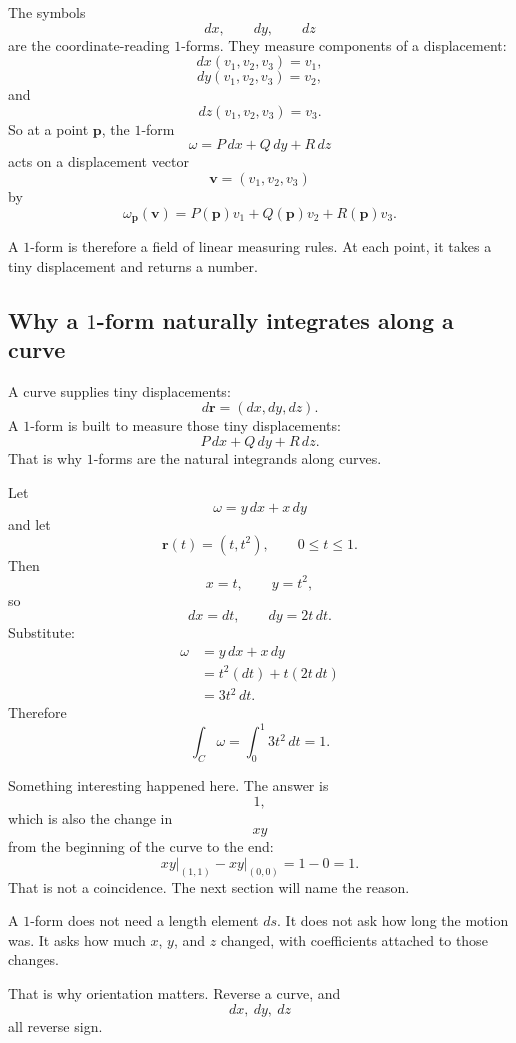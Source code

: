 The symbols
\[
    dx,\qquad dy,\qquad dz
\]
are the coordinate-reading \(1\)-forms.  They measure components of a displacement:
\[
    dx(v_1,v_2,v_3)=v_1,
\]
\[
    dy(v_1,v_2,v_3)=v_2,
\]
and
\[
    dz(v_1,v_2,v_3)=v_3.
\]
So at a point \(\mathbf p\), the \(1\)-form
\[
    \omega=P\,dx+Q\,dy+R\,dz
\]
acts on a displacement vector
\[
    \mathbf v=(v_1,v_2,v_3)
\]
by
\[
\boxed{
    \omega_{\mathbf p}(\mathbf v)
    =
    P(\mathbf p)v_1+Q(\mathbf p)v_2+R(\mathbf p)v_3.
}
\]

A \(1\)-form is therefore a field of linear measuring rules.  At each point, it takes a
tiny displacement and returns a number.

\subsection{Why a \(1\)-form naturally integrates along a curve}

A curve supplies tiny displacements:
\[
    d\mathbf r=(dx,dy,dz).
\]
A \(1\)-form is built to measure those tiny displacements:
\[
    P\,dx+Q\,dy+R\,dz.
\]
That is why \(1\)-forms are the natural integrands along curves.

\begin{example}
Let
\[
    \omega=y\,dx+x\,dy
\]
and let
\[
    \mathbf r(t)=(t,t^2),
    \qquad
    0\le t\le1.
\]
Then
\[
    x=t,\qquad y=t^2,
\]
so
\[
    dx=dt,
    \qquad
    dy=2t\,dt.
\]
Substitute:
\[
\begin{aligned}
\omega
&=
y\,dx+x\,dy\\
&=
t^2(dt)+t(2t\,dt)\\
&=
3t^2\,dt.
\end{aligned}
\]
Therefore
\[
\boxed{
    \int_C \omega
    =
    \int_0^1 3t^2\,dt
    =
    1.
}
\]

Something interesting happened here.  The answer is
\[
    1,
\]
which is also the change in
\[
    xy
\]
from the beginning of the curve to the end:
\[
    xy\big|_{(1,1)}-xy\big|_{(0,0)}=1-0=1.
\]
That is not a coincidence.  The next section will name the reason.
\end{example}

A \(1\)-form does not need a length element \(ds\).  It does not ask how long the
motion was.  It asks how much \(x\), \(y\), and \(z\) changed, with coefficients attached
to those changes.

That is why orientation matters.  Reverse a curve, and
\[
    dx,\ dy,\ dz
\]
all reverse sign.

